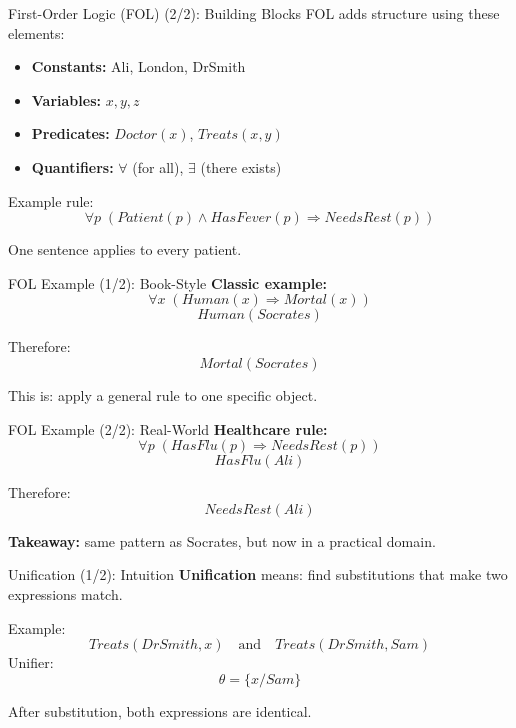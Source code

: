 \documentclass[10pt]{beamer}
\begin{document}
\begin{frame}{First-Order Logic (FOL) (2/2): Building Blocks}
        FOL adds structure using these elements:
        \begin{itemize}
                \item \textbf{Constants:} Ali, London, DrSmith
                \item \textbf{Variables:} $x, y, z$
                \item \textbf{Predicates:} $Doctor(x)$, $Treats(x,y)$
                \item \textbf{Quantifiers:} $\forall$ (for all), $\exists$ (there exists)
        \end{itemize}

        \vspace{0.12cm}
        Example rule:
        \[
            \forall p\; (Patient(p) \land HasFever(p) \Rightarrow NeedsRest(p))
        \]

        \vspace{0.08cm}
        One sentence applies to every patient.
\end{frame}

\begin{frame}{FOL Example (1/2): Book-Style}
        \textbf{Classic example:}
        \[
            \forall x\; (Human(x) \Rightarrow Mortal(x))
        \]
        \[
            Human(Socrates)
        \]

        \vspace{0.1cm}
        Therefore:
        \[
            Mortal(Socrates)
        \]

        \vspace{0.1cm}
        This is: apply a general rule to one specific object.
\end{frame}

\begin{frame}{FOL Example (2/2): Real-World}
        \textbf{Healthcare rule:}
        \[
            \forall p\; (HasFlu(p) \Rightarrow NeedsRest(p))
        \]
        \[
            HasFlu(Ali)
        \]

        \vspace{0.1cm}
        Therefore:
        \[
            NeedsRest(Ali)
        \]

        \vspace{0.12cm}
        \textbf{Takeaway:} same pattern as Socrates, but now in a practical domain.
\end{frame}

\begin{frame}{Unification (1/2): Intuition}
        \textbf{Unification} means:
        find substitutions that make two expressions match.

        \vspace{0.12cm}
        Example:
        \[
            Treats(DrSmith, x) \quad \text{and} \quad Treats(DrSmith, Sam)
        \]
        Unifier:
        \[
            \theta = \{x/Sam\}
        \]

        \vspace{0.12cm}
        After substitution, both expressions are identical.
\end{frame}
\end{document}
